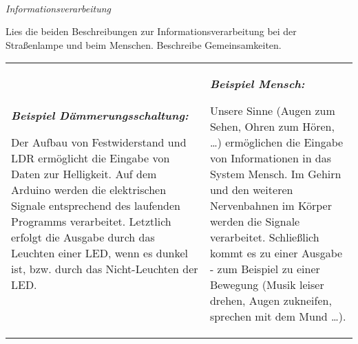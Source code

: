 \documentclass[ngerman, 11pt]{scrreprt}
\begin{document}
	\setcounter{chapter}{3}
	~
	\vspace{\baselineskip}
	
	\begin{aufgabe*} \emph{Informationsverarbeitung}
		
		Lies die beiden Beschreibungen zur Informationsverarbeitung bei der Straßenlampe und beim Menschen. Beschreibe Gemeinsamkeiten.
	\end{aufgabe*}
	
	\bigskip
	
	\begin{tabu} to \textwidth {X[L]X[L]}
		\emph{\bfseries Beispiel Dämmerungsschaltung:}
		
		Der Aufbau von Festwiderstand und LDR ermöglicht die Eingabe von Daten zur Helligkeit. Auf dem Arduino werden die elektrischen Signale entsprechend des laufenden Programms verarbeitet. Letztlich erfolgt die Ausgabe durch das Leuchten einer LED, wenn es dunkel ist, bzw. durch das Nicht-Leuchten der LED.
		
		&
		
		\emph{\bfseries Beispiel Mensch:}
		
		Unsere Sinne (Augen zum Sehen, Ohren zum Hören, \dots) ermöglichen die Eingabe von Informationen in das System Mensch. Im Gehirn und den weiteren Nervenbahnen im Körper werden die Signale verarbeitet. Schließlich kommt es zu einer Ausgabe - zum Beispiel zu einer Bewegung (Musik leiser drehen, Augen zukneifen, sprechen mit dem Mund \dots).
		\\
	\end{tabu}
\end{document}
